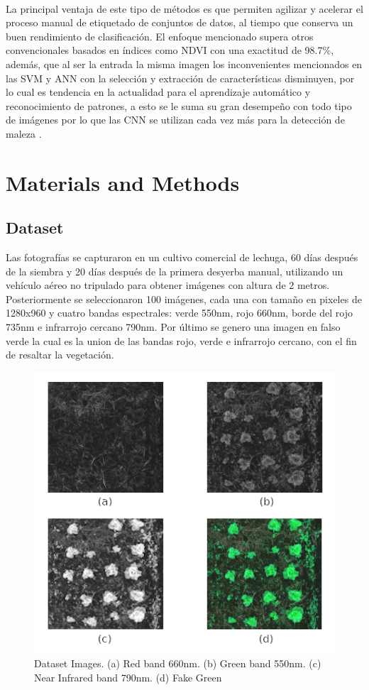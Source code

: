 \documentclass[journal,article,submit,moreauthors,pdftex]{Definitions/mdpi}
\begin{document}
\\
La principal ventaja de este tipo de métodos es que permiten agilizar y acelerar el proceso manual de etiquetado de conjuntos de datos, al tiempo que conserva un buen rendimiento de clasificación. El enfoque mencionado supera otros convencionales basados en índices como  NDVI con una exactitud de 98.7\%, además, que al ser la entrada la misma imagen los inconvenientes mencionados en las SVM y ANN con la selección y extracción de características disminuyen, por lo cual es tendencia en la actualidad para el aprendizaje automático y reconocimiento de patrones, a esto se le suma su gran desempeño con todo tipo de imágenes por lo que las CNN se utilizan cada vez más para la detección de maleza \cite{c40}.

\section{Materials and Methods}
\subsection{Dataset}

Las fotografías se capturaron en un cultivo comercial de lechuga, 60 días después de la siembra y 20 días después de la primera desyerba manual, utilizando un vehículo aéreo no tripulado para obtener imágenes con altura de 2 metros. Posteriormente se seleccionaron 100 imágenes, cada una con tamaño en pixeles de 1280x960 y cuatro bandas espectrales: verde 550nm, rojo 660nm, borde del rojo 735nm e infrarrojo cercano 790nm. Por último se genero una imagen en falso verde la cual  es la union de las bandas rojo, verde e infrarrojo cercano, con el fin de resaltar la vegetación. 

\begin{figure}[H]
    \centering
    \includegraphics[scale=0.7]{dataset.png}
     \centering
    \caption{Dataset Images. (a) Red band 660nm. (b) Green band 550nm. (c) Near Infrared band 790nm. (d) Fake Green}
\end{figure}
\end{document}
